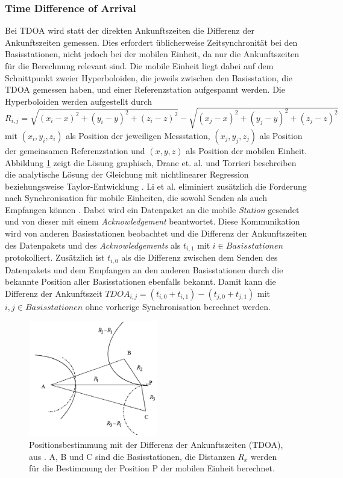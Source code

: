\subsubsection{Time Difference of Arrival}
Bei TDOA wird statt der direkten Ankunftszeiten die Differenz der Ankunftszeiten gemessen. 
Dies erfordert üblicherweise Zeitsynchronität bei den Basisstationen, nicht jedoch bei der mobilen Einheit, da nur die Ankunftszeiten für die Berechnung relevant sind. 
Die mobile Einheit liegt dabei auf dem Schnittpunkt zweier Hyperboloiden, die jeweils zwischen den Basisstation, die TDOA gemessen haben, und einer Referenzstation aufgespannt werden. 
Die Hyperboloiden werden aufgestellt durch 
$R_{i,j} = \sqrt{(x_i - x)^2 + (y_i - y)^2 + (z_i - z)^2} - \sqrt{(x_j - x)^2 + (y_j - y)^2 + (z_j - z)^2}$ mit $(x_i,y_i,z_i)$ als Position der jeweiligen Messstation, $(x_j,y_j,z_j)$ als Position der gemeinsamen Referenzstation und $(x,y,z)$ als Position der mobilen Einheit. 
Abbildung \ref{fig:tdoa} zeigt die Lösung graphisch, Drane et. al. und Torrieri beschreiben die analytische Lösung der Gleichung mit nichtlinearer Regression \cite{drane1998positioning} beziehungsweise Taylor-Entwicklung \cite{torrieri1984statistical}. 
Li et al. eliminiert zusätzlich die Forderung nach Synchronisation für mobile Einheiten, die sowohl Senden als auch Empfangen können \cite{li2000comparison}. 
Dabei wird ein Datenpaket an die mobile \emph{Station} gesendet und von dieser mit einem \emph{Acknowledgement} beantwortet. 
Diese Kommunikation wird von anderen Basisstationen beobachtet und die Differenz der Ankunftszeiten des Datenpakets und des \emph{Acknowledgements} als $t_{i,1}$ mit $i \in Basisstationen$ protokolliert. 
Zusätzlich ist $t_{i,0}$ als die Differenz zwischen dem Senden des Datenpakets und dem Empfangen an den anderen Basisstationen durch die bekannte Position aller Basisstationen ebenfalls bekannt. 
Damit kann die Differenz der Ankunftszeit $TDOA_{i,j} = (t_{i,0} + t_{i,1}) - (t_{j,0} + t_{j,1})$ mit $i,j \in Basisstationen$ ohne vorherige Synchronisation berechnet werden. 

\begin{figure}[h]
  \centering
	\includegraphics[width=0.5\textwidth]{images/tdoa.png}
  \caption{Positionsbestimmung mit der Differenz der Ankunftszeiten (TDOA), aus \cite{liu2007survey}. A, B und C sind die Basisstationen, die Distanzen $R_x$ werden für die Bestimmung der Position P der mobilen Einheit berechnet.}
  \label{fig:tdoa}
\end{figure}

